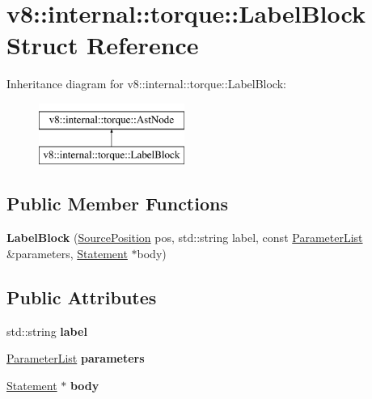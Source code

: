 \hypertarget{structv8_1_1internal_1_1torque_1_1LabelBlock}{}\section{v8\+:\+:internal\+:\+:torque\+:\+:Label\+Block Struct Reference}
\label{structv8_1_1internal_1_1torque_1_1LabelBlock}
Inheritance diagram for v8\+:\+:internal\+:\+:torque\+:\+:Label\+Block\+:\begin{figure}[H]
\begin{center}
\leavevmode
\includegraphics[height=2.000000cm]{structv8_1_1internal_1_1torque_1_1LabelBlock}
\end{center}
\end{figure}
\subsection*{Public Member Functions}
\begin{DoxyCompactItemize}
\item 
\mbox{\label{structv8_1_1internal_1_1torque_1_1LabelBlock_a2f2218923b5a03fe6d1d6ac0dd9bfc34}} 
{\bfseries Label\+Block} (\mbox{\hyperlink{structv8_1_1internal_1_1torque_1_1SourcePosition}{Source\+Position}} pos, std\+::string label, const \mbox{\hyperlink{structv8_1_1internal_1_1torque_1_1ParameterList}{Parameter\+List}} \&parameters, \mbox{\hyperlink{structv8_1_1internal_1_1torque_1_1Statement}{Statement}} $\ast$body)
\end{DoxyCompactItemize}
\subsection*{Public Attributes}
\begin{DoxyCompactItemize}
\item 
\mbox{\label{structv8_1_1internal_1_1torque_1_1LabelBlock_aaf86d418c7cffd9880c1cc85c33d3987}} 
std\+::string {\bfseries label}
\item 
\mbox{\label{structv8_1_1internal_1_1torque_1_1LabelBlock_af7d2b91bd383384f19a0358ef385f599}} 
\mbox{\hyperlink{structv8_1_1internal_1_1torque_1_1ParameterList}{Parameter\+List}} {\bfseries parameters}
\item 
\mbox{\label{structv8_1_1internal_1_1torque_1_1LabelBlock_a874114fb0d0f4e872c14d98464fe3d4a}} 
\mbox{\hyperlink{structv8_1_1internal_1_1torque_1_1Statement}{Statement}} $\ast$ {\bfseries body}
\end{DoxyCompactItemize}
